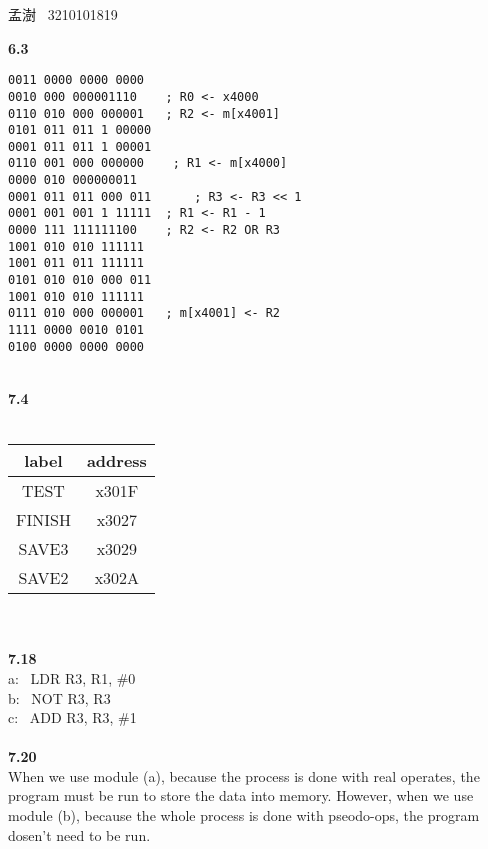 \documentclass[a4paper,12pt]{article}     %
\begin{document}
\begin{center}   %
孟澍 \ 3210101819
\end{center}


\noindent %
\textbf{6.3}\\
\begin{Verbatim}[frame = single]
0011 0000 0000 0000
0010 000 000001110    ; R0 <- x4000
0110 010 000 000001   ; R2 <- m[x4001]
0101 011 011 1 00000
0001 011 011 1 00001
0110 001 000 000000    ; R1 <- m[x4000]
0000 010 000000011
0001 011 011 000 011      ; R3 <- R3 << 1
0001 001 001 1 11111  ; R1 <- R1 - 1
0000 111 111111100    ; R2 <- R2 OR R3
1001 010 010 111111
1001 011 011 111111
0101 010 010 000 011
1001 010 010 111111
0111 010 000 000001   ; m[x4001] <- R2
1111 0000 0010 0101
0100 0000 0000 0000
\end{Verbatim}

~\\
\textbf{7.4}\\
~\\
\begin{tabular}{|c|c|}
  \hline
  label & address \\
  \hline
  TEST & x301F \\
  \hline
  FINISH & x3027 \\
  \hline
  SAVE3 & x3029 \\
  \hline
  SAVE2 & x302A \\
  \hline
\end{tabular}\\

~\\
\textbf{7.18}\\
a: \ LDR R3, R1, \#0 \\
b: \ NOT R3, R3 \\
c: \ ADD R3, R3, \#1 \\

~\\
\textbf{7.20}\\
When we use module (a), because the process is done with real operates, the program must be run to store the data into memory. However, when we use module (b), because the whole process is done with pseodo-ops, the program dosen't need to be run.\\
\end{document}
